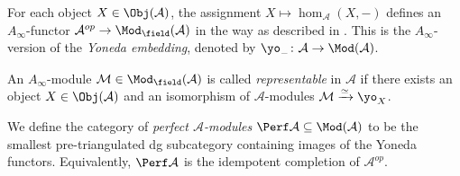 For each object $X\in\Obj (\mathcal{A})$, the assignment $X\mapsto\hom_{\mathcal{A}} (X,-)$ defines an $A_{\infty}$-functor $\mathcal{A}^{op}\to\Mod_{\field} (\mathcal{A})$ in the way as described in \cite[section (1l)]{Seidel08}. This is the $A_{\infty}$-version of the \emph{Yoneda embedding}, denoted by $\yo_{-}\colon\mathcal{A}\to\Mod (\mathcal{A})$.
\begin{dfn}
    An $A_{\infty}$-module $\mathcal{M}\in\Mod_{\field} (\mathcal{A})$ is called \emph{representable} in $\mathcal{A}$ if there exists an object $X\in\Obj (\mathcal{A})$ and an isomorphism of $\mathcal{A}$-modules $\mathcal{M}\xrightarrow{\simeq}\yo_X$.\par
    We define the category of \emph{perfect $\mathcal{A}$-modules} $\Perf\mathcal{A}\subseteq\Mod (\mathcal{A})$ to be the smallest pre-triangulated dg subcategory containing images of the Yoneda functors.
    Equivalently, $\Perf\mathcal{A}$ is the idempotent completion of $\mathcal{A}^{op}$.
\end{dfn}

